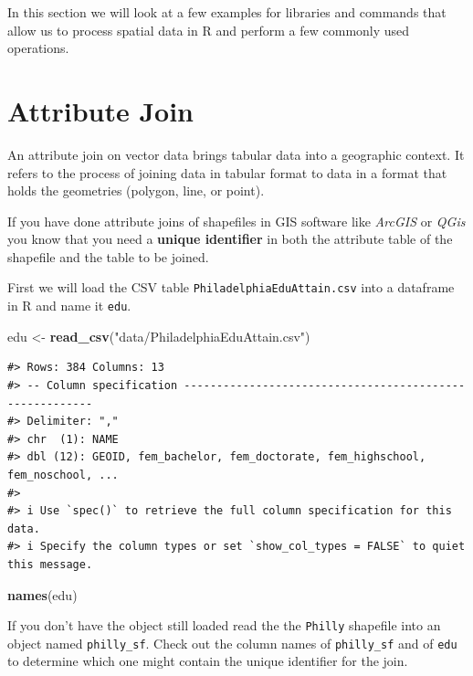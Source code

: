 \documentclass[
]{book}
\newenvironment{Shaded}{\begin{snugshade}}{\end{snugshade}}
\newcommand{\FunctionTok}[1]{\textcolor[rgb]{0.13,0.29,0.53}{\textbf{#1}}}
\newcommand{\NormalTok}[1]{#1}
\newcommand{\OtherTok}[1]{\textcolor[rgb]{0.56,0.35,0.01}{#1}}
\newcommand{\StringTok}[1]{\textcolor[rgb]{0.31,0.60,0.02}{#1}}
\begin{document}
In this section we will look at a few examples for libraries and commands that allow us to process spatial data in R and perform a few commonly used operations.

\section{Attribute Join}\label{attribute-join}

An attribute join on vector data brings tabular data into a geographic context. It refers to the process of joining data in tabular format to data in a format that holds the geometries (polygon, line, or point).

If you have done attribute joins of shapefiles in GIS software like \emph{ArcGIS} or \emph{QGis} you know that you need a \textbf{unique identifier} in both the attribute table of the shapefile and the table to be joined.

First we will load the CSV table \texttt{PhiladelphiaEduAttain.csv} into a dataframe in R and name it \texttt{edu}.

\begin{Shaded}
\begin{Highlighting}[]
\NormalTok{edu }\OtherTok{\textless{}{-}} \FunctionTok{read\_csv}\NormalTok{(}\StringTok{"data/PhiladelphiaEduAttain.csv"}\NormalTok{)}
\end{Highlighting}
\end{Shaded}

\begin{verbatim}
#> Rows: 384 Columns: 13
#> -- Column specification --------------------------------------------------------
#> Delimiter: ","
#> chr  (1): NAME
#> dbl (12): GEOID, fem_bachelor, fem_doctorate, fem_highschool, fem_noschool, ...
#> 
#> i Use `spec()` to retrieve the full column specification for this data.
#> i Specify the column types or set `show_col_types = FALSE` to quiet this message.
\end{verbatim}

\begin{Shaded}
\begin{Highlighting}[]
\FunctionTok{names}\NormalTok{(edu)}
\end{Highlighting}
\end{Shaded}

If you don't have the object still loaded read the the \texttt{Philly} shapefile into an object named \texttt{philly\_sf}. Check out the column names of \texttt{philly\_sf} and of \texttt{edu} to determine which one might contain the unique identifier for the join.
\end{document}
